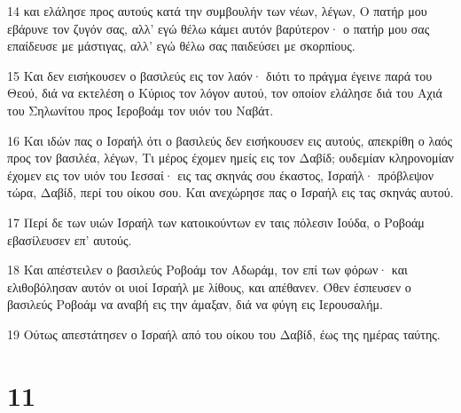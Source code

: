 \par 14 και ελάλησε προς αυτούς κατά την συμβουλήν των νέων, λέγων, Ο πατήρ μου εβάρυνε τον ζυγόν σας, αλλ' εγώ θέλω κάμει αυτόν βαρύτερον· ο πατήρ μου σας επαίδευσε με μάστιγας, αλλ' εγώ θέλω σας παιδεύσει με σκορπίους.
\par 15 Και δεν εισήκουσεν ο βασιλεύς εις τον λαόν· διότι το πράγμα έγεινε παρά του Θεού, διά να εκτελέση ο Κύριος τον λόγον αυτού, τον οποίον ελάλησε διά του Αχιά του Σηλωνίτου προς Ιεροβοάμ τον υιόν του Ναβάτ.
\par 16 Και ιδών πας ο Ισραήλ ότι ο βασιλεύς δεν εισήκουσεν εις αυτούς, απεκρίθη ο λαός προς τον βασιλέα, λέγων, Τι μέρος έχομεν ημείς εις τον Δαβίδ; ουδεμίαν κληρονομίαν έχομεν εις τον υιόν του Ιεσσαί· εις τας σκηνάς σου έκαστος, Ισραήλ· πρόβλεψον τώρα, Δαβίδ, περί του οίκου σου. Και ανεχώρησε πας ο Ισραήλ εις τας σκηνάς αυτού.
\par 17 Περί δε των υιών Ισραήλ των κατοικούντων εν ταις πόλεσιν Ιούδα, ο Ροβοάμ εβασίλευσεν επ' αυτούς.
\par 18 Και απέστειλεν ο βασιλεύς Ροβοάμ τον Αδωράμ, τον επί των φόρων· και ελιθοβόλησαν αυτόν οι υιοί Ισραήλ με λίθους, και απέθανεν. Όθεν έσπευσεν ο βασιλεύς Ροβοάμ να αναβή εις την άμαξαν, διά να φύγη εις Ιερουσαλήμ.
\par 19 Ούτως απεστάτησεν ο Ισραήλ από του οίκου του Δαβίδ, έως της ημέρας ταύτης.

\chapter{11}

